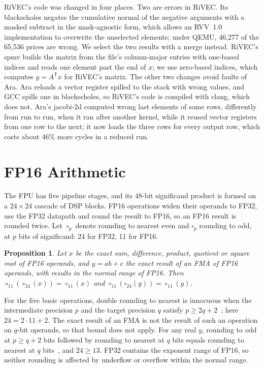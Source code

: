RiVEC's code was changed in four places. Two are errors in RiVEC. Its blackscholes
negates the cumulative normal of the negative arguments with a masked subtract in the
mask-agnostic form, which allows an RVV~1.0 implementation to overwrite the unselected
elements; under QEMU, 46,277 of the 65,536 prices are wrong. We select the two results
with a merge instead. RiVEC's spmv builds the matrix from the file's column-major
entries with one-based indices and reads one element past the end of $x$; we use
zero-based indices, which computes $y=A^{\mathsf T}x$ for RiVEC's matrix. The other two
changes avoid faults of Ara. Ara reloads a vector register spilled to the stack with
wrong values, and GCC spills one in blackscholes, so RiVEC's code is compiled with
clang, which does not. Ara's jacobi-2d computed wrong last elements of some rows,
differently from run to run, when it ran after another kernel, while it reused vector
registers from one row to the next; it now loads the three rows for every output row,
which costs about 46\% more cycles in a reduced run.

\section{FP16 Arithmetic}\label{sup:fp16}
The FPU has five pipeline stages, and its 48-bit significand product is formed on a
$24\times24$ cascade of DSP blocks. FP16 operations widen their operands to FP32, use
the FP32 datapath and round the result to FP16, so an FP16 result is rounded twice. Let
$\circ_p$ denote rounding to nearest even and $\square_p$ rounding to odd, at $p$ bits
of significand: 24 for FP32, 11 for FP16.

\newtheorem{sproposition}{Proposition}
\renewcommand{\thesproposition}{S\arabic{sproposition}}
\begin{sproposition}
Let $x$ be the exact sum, difference, product, quotient or square root of FP16
operands, and $y=ab+c$ the exact result of an FMA of FP16 operands, with results in the
normal range of FP16. Then $\circ_{11}(\circ_{24}(x))=\circ_{11}(x)$ and
$\circ_{11}(\square_{24}(y))=\circ_{11}(y)$.
\end{sproposition}
\begin{IEEEproof}
For the five basic operations, double rounding to nearest is innocuous when the
intermediate precision $p$ and the target precision $q$ satisfy
$p\ge2q+2$~\cite{figueroa}; here $24=2\cdot11+2$. The exact result of an FMA is not the
result of such an operation on $q$-bit operands, so that bound does not apply. For any
real $y$, rounding to odd at $p\ge q+2$ bits followed by rounding to nearest at $q$
bits equals rounding to nearest at $q$ bits~\cite{boldo}, and $24\ge13$. FP32 contains
the exponent range of FP16, so neither rounding is affected by underflow or overflow
within the normal range.
\end{IEEEproof}

